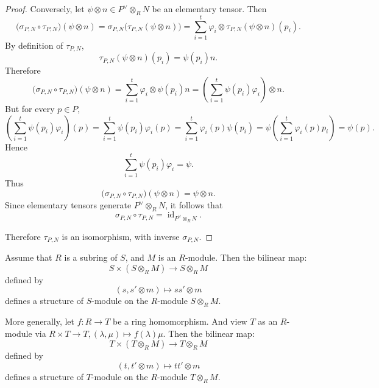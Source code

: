 \begin{proof}
    Conversely, let $\psi\otimes n\in P^\vee\otimes_R N$ be an elementary tensor.
    Then
    \[
        \bigl(\sigma_{P,N}\circ \tau_{P,N}\bigr)(\psi\otimes n)
        =
        \sigma_{P,N}\bigl(\tau_{P,N}(\psi\otimes n)\bigr)
        =
        \sum_{i=1}^t
        \varphi_i\otimes \tau_{P,N}(\psi\otimes n)(p_i).
    \]
    By definition of $\tau_{P,N}$,
    \[
        \tau_{P,N}(\psi\otimes n)(p_i)
        =
        \psi(p_i)n.
    \]
    Therefore
    \[
        \bigl(\sigma_{P,N}\circ \tau_{P,N}\bigr)(\psi\otimes n)
        =
        \sum_{i=1}^t \varphi_i\otimes \psi(p_i)n
        =
        \left(\sum_{i=1}^t \psi(p_i)\varphi_i\right)\otimes n.
    \]
    But for every $p\in P$,
    \[
        \left(\sum_{i=1}^t \psi(p_i)\varphi_i\right)(p)
        =
        \sum_{i=1}^t \psi(p_i)\varphi_i(p)
        =
        \sum_{i=1}^t \varphi_i(p)\psi(p_i)
        =
        \psi\left(\sum_{i=1}^t \varphi_i(p)p_i\right)
        =
        \psi(p).
    \]
    Hence
    \[
        \sum_{i=1}^t \psi(p_i)\varphi_i=\psi.
    \]
    Thus
    \[
        \bigl(\sigma_{P,N}\circ \tau_{P,N}\bigr)(\psi\otimes n)
        =
        \psi\otimes n.
    \]
    Since elementary tensors generate $P^\vee\otimes_R N$, it follows that
    \[
        \sigma_{P,N}\circ \tau_{P,N}
        =
        \operatorname{id}_{P^\vee\otimes_R N}.
    \]

    Therefore $\tau_{P,N}$ is an isomorphism, with inverse $\sigma_{P,N}$.
\end{proof}

\begin{proposition}
    Assume that $R$ is a subring of $S$, and $M$ is an $R$-module. Then the bilinear map:
    \[
        S \times (S \otimes_R M) \to S \otimes_R M
    \]
    defined by
    \[
        (s, s' \otimes m) \mapsto s s' \otimes m
    \]
    defines a structure of $S$-module on the $R$-module $S \otimes_R M$.

    More generally, let $f: R \to T$ be a ring homomorphism. And view $T$ as an $R$-module via $R \times T \to T, (\lambda, \mu) \mapsto f(\lambda) \mu$. Then the bilinear map:
    \[
        T \times (T \otimes_R M) \to T \otimes_R M
    \]
    defined by
    \[
        (t, t' \otimes m) \mapsto t t' \otimes m
    \]
    defines a structure of $T$-module on the $R$-module $T \otimes_R M$.
\end{proposition}


